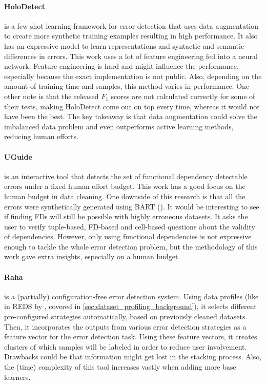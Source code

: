 \paragraph{HoloDetect \cite{Heidari2019-ox}} is a few-shot learning framework for error detection that uses data augmentation to create more synthetic training examples resulting in high performance. It also has an expressive model to learn representations and syntactic and semantic differences in errors. This work uses a lot of feature engineering fed into a neural network. Feature engineering is hard and might influence the performance, especially because the exact implementation is not public. Also, depending on the amount of training time and samples, this method varies in performance. One other note is that the released $F_1$ scores are not calculated correctly for some of their tests, making HoloDetect come out on top every time, whereas it would not have been the best. The key takeaway is that data augmentation could solve the imbalanced data problem and even outperforms active learning methods, reducing human efforts. 

\paragraph{UGuide \cite{Thirumuruganathan2017-ip}} is an interactive tool that detects the set of functional dependency detectable errors under a fixed human effort budget. This work has a good focus on the human budget in data cleaning. One downside of this research is that all the errors were synthetically generated using BART (\cite{Arocena2015-om}). It would be interesting to see if finding FDs will still be possible with highly erroneous datasets. It asks the user to verify tuple-based, FD-based and cell-based questions about the validity of dependencies. However, only using functional dependencies is not expressive enough to tackle the whole error detection problem, but the methodology of this work gave extra insights, especially on a human budget.


\paragraph{Raha \cite{Mahdavi2019-zf}} is a (partially) configuration-free error detection system. Using data profiles (like in REDS by \cite{Mahdavi2019-pk}, covered in \autoref{sec:dataset_profiling_background}), it selects different pre-configured strategies automatically, based on previously cleaned datasets. Then, it incorporates the outputs from various error detection strategies as a feature vector for the error detection task. 
Using these feature vectors, it creates clusters of which samples will be labeled in order to reduce user involvement. Drawbacks could be that information might get lost in the stacking process. Also, the (time) complexity of this tool increases vastly when adding more base learners.

